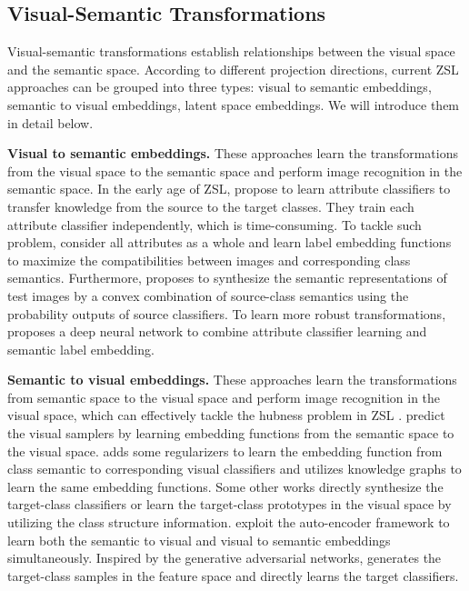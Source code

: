 \documentclass[10pt,twocolumn,letterpaper]{article}
\begin{document}
\subsection{Visual-Semantic Transformations}

Visual-semantic transformations establish relationships between the visual space and the semantic space. According to different projection directions, current ZSL approaches can be grouped into three types: visual to semantic embeddings, semantic to visual embeddings, latent space embeddings. We will introduce them in detail below.

\textbf{Visual to semantic embeddings.} These approaches learn the transformations from the visual space to the semantic space and perform image recognition in the semantic space. In the early age of ZSL, \cite{lampert2009learning,farhadi2009describing} propose to learn attribute classifiers to transfer knowledge from the source to the target classes. They train each attribute classifier independently, which is time-consuming. To tackle such problem, \cite{akata2013label,akata2015evaluation} consider all attributes as a whole and learn label embedding functions to maximize the compatibilities between images and corresponding class semantics. Furthermore, \cite{Norouzi2014ZeroShotLB} proposes to synthesize the semantic representations of test images by a convex combination of source-class semantics using the probability outputs of source classifiers. To learn more robust transformations, \cite{Morgado2017SemanticallyCR} proposes a deep neural network to combine attribute classifier learning and semantic label embedding.

\textbf{Semantic to visual embeddings.} These approaches learn the transformations from semantic space to the visual space and perform image recognition in the visual space, which can effectively tackle the hubness problem in ZSL \cite{dinu2014improving,shigeto2015ridge}. \cite{Changpinyo2017PredictingVE,Long2017ZeroshotLU,Zhang2017LearningAD} predict the visual samplers by learning embedding functions from the semantic space to the visual space. \cite{romera2015embarrassingly} adds some regularizers to learn the embedding function from class semantic to corresponding visual classifiers and \cite{wang2018zero} utilizes knowledge graphs to learn the same embedding functions. Some other works directly synthesize the target-class classifiers \cite{Changpinyo2016SynthesizedCF} or learn the target-class prototypes \cite{jiang2018learning} in the visual space by utilizing the class structure information. \cite{Kodirov2017SemanticAF,chen2018zero} exploit the auto-encoder framework to learn both the semantic to visual and visual to semantic embeddings simultaneously. Inspired by the generative adversarial networks, \cite{xian2018feature} generates the target-class samples in the feature space and directly learns the target classifiers.
\end{document}
